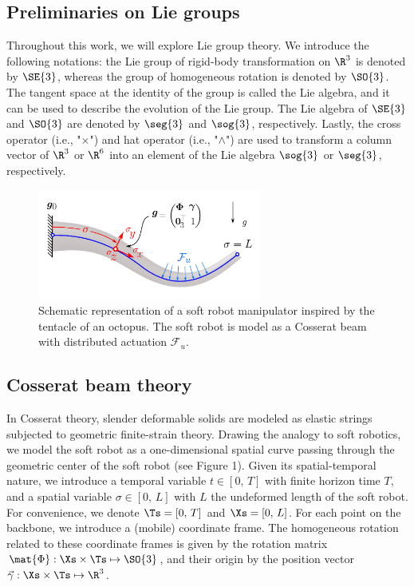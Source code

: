 \subsection{Preliminaries on Lie groups}
Throughout this work, we will explore Lie group theory. We introduce the following notations: the Lie group of rigid-body transformation on $\R^3$ is denoted by $\SE{3}$, whereas the group of homogeneous rotation is denoted by $\SO{3}$. The tangent space at the identity of the group is called the Lie algebra, and it can be used to describe the evolution of the Lie group. The Lie algebra of $\SE{3}$ and $\SO{3}$ are denoted by $\seg{3}$ and $\sog{3}$, respectively. Lastly, the cross operator (i.e., "$\times$") and hat operator (i.e., "$\wedge$") are used to transform a column vector of $\R^3$ or $\R^6$ into an element of the Lie algebra $\sog{3}$ or $\seg{3}$, respectively.
%
\begin{figure}[!t]
  \vspace{-0.6mm}
  \centering
   \includegraphics[width = 0.65\textwidth]{3_chapters/3_chapter/img/system.pdf}
  \caption{Schematic representation of a soft robot manipulator inspired by the tentacle of an octopus. The soft robot is model as a Cosserat beam with distributed actuation $\mathcal{F}_u$. \label{fig:example1}}
  \vspace{-0.1cm}
\end{figure}
%
\subsection{Cosserat beam theory}
In Cosserat theory, slender deformable solids are modeled as elastic strings subjected to geometric finite-strain theory. Drawing the analogy to soft robotics, we model the soft robot as a one-dimensional spatial curve passing through the geometric center of the soft robot (see Figure 1). Given its spatial-temporal nature, we introduce a temporal variable $t \in [0,\,T]$ with finite horizon time $T$, and a spatial variable $\sigma \in [0,\,L]$ with $L$ the undeformed length of the soft robot. For convenience, we denote $\Ts = [0,\,T]$ and $\Xs = [0,\,L]$. For each point on the backbone, we introduce a (mobile) coordinate frame. The homogeneous rotation related to these coordinate frames is given by the rotation matrix $\mat{\Phi}: \Xs \times \Ts \mapsto  \SO{3}$, and their origin by the position vector $\vec{\gamma}: \Xs \times \Ts \mapsto \R^3$.

